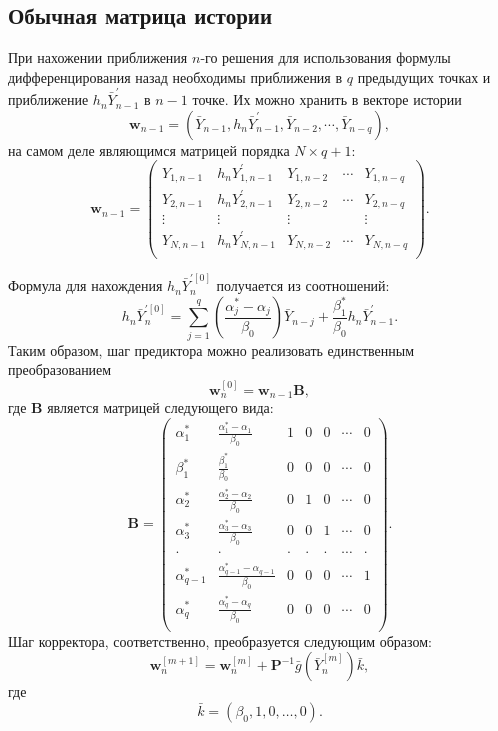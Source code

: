 \documentclass[oneside,final,14pt]{extreport}
\begin{document}
\subsection{Обычная матрица истории}
При нахожении приближения \(n\)-го решения для использования формулы дифференцирования назад необходимы приближения в \(q\) предыдущих точках и приближение \(h_n\bar Y_{n-1}^{'}\) в \(n-1\) точке. Их можно хранить в векторе истории
\[\mathbf w_{n-1}=(\bar Y_{n-1} , h_n\bar Y_{n-1}^{'} , \bar Y_{n-2} , \cdots , \bar Y_{n-q})
,\]
на самом деле являющимся матрицей порядка \(N\times q+1\):
\begin{equation}
\label{history}
\mathbf w_{n-1}=
\begin{pmatrix}
	Y_{1,n-1} & h_n Y_{1,n-1}^{'} & Y_{1,n-2} & \cdots &  Y_{1,n-q}\\
	Y_{2,n-1} & h_n Y_{2,n-1}^{'} & Y_{2,n-2} & \cdots &  Y_{2,n-q}\\
	\vdots & \vdots & \vdots &  &  \vdots\\
	Y_{N,n-1} & h_n Y_{N,n-1}^{'} & Y_{N,n-2} & \cdots &  Y_{N,n-q}\\
\end{pmatrix}.
\end{equation}

Формула для нахождения \(h_n\bar Y_{n}^{'[0]}\) получается из соотношений:
\[
h_n\bar Y_{n}^{'[0]}=\sum_{j=1}^q\left(\frac{\alpha_j^*-\alpha_j}{\beta_0}\right)\bar Y_{n-j}+\frac{\beta_1^*}{\beta_0}h_n\bar Y_{n-1}^{'}.
\]
Таким образом, шаг предиктора можно реализовать единственным преобразованием
\begin{equation}
\label{predictor}
\mathbf w_n^{[0]}=\mathbf w_{n-1} \mathbf B ,\end{equation}
где \(\mathbf B\) является матрицей следующего вида:
\begin{equation}
\label{B}
\mathbf{B}=
\begin{pmatrix}
\alpha_1^* & \frac{\alpha_1^*-\alpha_1}{\beta_0} & 1 & 0 & 0 & \cdots & 0\\
\beta_1^* & \frac{\beta_1^*}{\beta_0} & 0 & 0 & 0 & \cdots & 0\\
\alpha_2^* & \frac{\alpha_2^*-\alpha_2}{\beta_0} & 0 & 1 & 0 & \cdots & 0\\
\alpha_3^* & \frac{\alpha_3^*-\alpha_3}{\beta_0} & 0 & 0 & 1 & \cdots & 0\\
\cdot & \cdot & \cdot & \cdot & \cdot & \cdots & \cdot \\
\alpha_{q-1}^* & \frac{\alpha_{q-1}^*-\alpha_{q-1}}{\beta_0} & 0 & 0 & 0 & \cdots & 1\\
\alpha_q^* & \frac{\alpha_q^*-\alpha_q}{\beta_0} & 0 & 0 & 0 & \cdots & 0\\
\end{pmatrix}.
\end{equation}
Шаг корректора, соответственно, преобразуется следующим образом: 
\begin{equation}
\label{corrector}
\mathbf w_n^{[m+1]}=\mathbf w_n^{[m]}+\mathbf P^{-1}\bar g(\bar Y_n^{[m]})\bar k,
\end{equation}
где
\[\bar k=(\beta_0, 1,0,\ldots,0).\]
\end{document}
